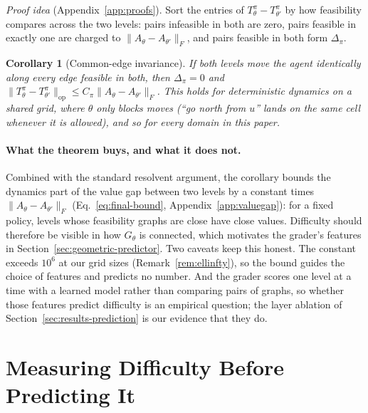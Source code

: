 \documentclass[twoside]{article}
\newtheorem{corollary}[theorem]{Corollary}
\begin{document}
\noindent \emph{Proof idea} (Appendix~\ref{app:proofs}). Sort the entries of $T^\pi_\theta - T^\pi_{\theta'}$ by how feasibility compares across the two levels: pairs infeasible in both are zero, pairs feasible in exactly one are charged to $\|A_\theta - A_{\theta'}\|_F$, and pairs feasible in both form $\Delta_\pi$.

\begin{corollary}[Common-edge invariance]
\label{cor:common-edge}
If both levels move the agent identically along every edge feasible in both, then $\Delta_\pi=0$ and $\|T^\pi_\theta - T^\pi_{\theta'}\|_{\mathrm{op}} \le C_\pi \|A_\theta-A_{\theta'}\|_F$. This holds for deterministic dynamics on a shared grid, where $\theta$ only blocks moves (``go north from $u$'' lands on the same cell whenever it is allowed), and so for every domain in this paper.
\end{corollary}

\paragraph{What the theorem buys, and what it does not.} Combined with the standard resolvent argument, the corollary bounds the dynamics part of the value gap between two levels by a constant times $\|A_\theta-A_{\theta'}\|_F$ (Eq.~\ref{eq:final-bound}, Appendix~\ref{app:valuegap}): for a fixed policy, levels whose feasibility graphs are close have close values. Difficulty should therefore be visible in how $G_\theta$ is connected, which motivates the grader's features in Section~\ref{sec:geometric-predictor}. Two caveats keep this honest. The constant exceeds $10^6$ at our grid sizes (Remark~\ref{rem:ellinfty}), so the bound guides the choice of features and predicts no number. And the grader scores one level at a time with a learned model rather than comparing pairs of graphs, so whether those features predict difficulty is an empirical question; the layer ablation of Section~\ref{sec:results-prediction} is our evidence that they do.

\section{Measuring Difficulty Before Predicting It}
\label{sec:framework}
\label{sec:reliability}
\end{document}
